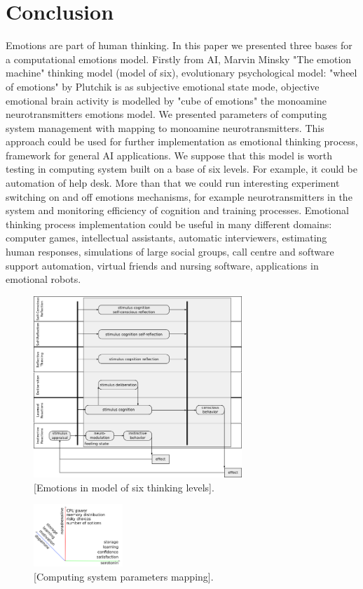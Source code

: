 \section{Conclusion}

Emotions are part of human thinking. In this paper we presented three bases for a computational emotions model. Firstly from AI, Marvin Minsky "The emotion machine" \cite{emotionmachine} thinking model (model of six), evolutionary psychological model: "wheel of emotions" by Plutchik \cite{natureofemotions} is as subjective emotional state mode, objective emotional brain activity is modelled by "cube of emotions" the monoamine neurotransmitters emotions model. We presented parameters of computing system management with mapping to monoamine neurotransmitters. This approach could be used for further implementation as emotional thinking process, framework for general AI applications. We suppose that this model is worth testing in computing system built on a base of six levels. For example, it could be automation of help desk. More than that we could run interesting experiment switching on and off emotions mechanisms, for example neurotransmitters in the system and monitoring efficiency of cognition and training processes. Emotional thinking process implementation could be useful in many different domains: computer games, intellectual assistants, automatic interviewers, estimating human responses, simulations of large social groups, call centre and software support automation, virtual friends and nursing software, applications in emotional robots.

\begin{figure}[h!]
 \centering
 \includegraphics[width=0.7\textwidth]{six_levels_of_emotions}
 \caption{[Emotions in model of six thinking levels].}
\end{figure}

\begin{figure}[h!]
 \centering
 \includegraphics[width=0.3\textwidth]{parameters_mapping180}
 \caption{[Computing system parameters mapping].}
\end{figure}